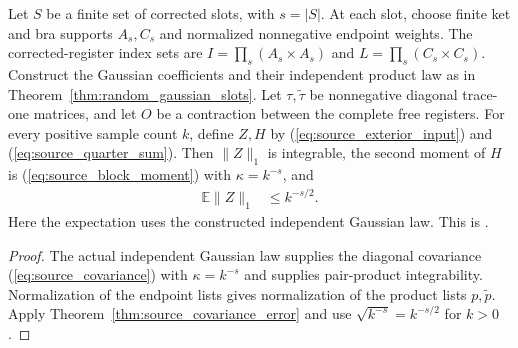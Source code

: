\begin{theorem}
    \label{thm:source_gaussian_error}
    \leanok
    Let $S$ be a finite set of corrected slots, with $s=|S|$. At each slot,
    choose finite ket and bra supports $A_s,C_s$ and normalized nonnegative
    endpoint weights. The corrected-register index sets are
    $I=\prod_s(A_s\times A_s)$ and $L=\prod_s(C_s\times C_s)$.
    Construct the Gaussian coefficients and their independent
    product law as in Theorem~\ref{thm:random_gaussian_slots}.
    Let $\tau,\widetilde\tau$ be nonnegative diagonal trace-one matrices,
    and let $O$ be a contraction between the complete free registers.
    For every positive sample count $k$, define $Z,H$ by
    (\ref{eq:source_exterior_input}) and (\ref{eq:source_quarter_sum}).
    Then $\lVert Z\rVert_1$ is integrable, the second moment of $H$ is
    (\ref{eq:source_block_moment}) with $\kappa=k^{-s}$, and
    \begin{align}
        \mathbb E\lVert Z\rVert_1 & \leq k^{-s/2}.
        \label{eq:source_gaussian_error}
    \end{align}
    Here the expectation uses the constructed independent Gaussian law.
    This is \cite[Equation~(5.18)]{OpenAI2026PolynomialPEPS}.
\end{theorem}

\begin{proof}\leanok
    The actual independent Gaussian law supplies the diagonal covariance
    (\ref{eq:source_covariance}) with $\kappa=k^{-s}$ and supplies pair-product
    integrability. Normalization of the endpoint lists gives normalization
    of the product lists $p,\widetilde p$.
    Apply Theorem~\ref{thm:source_covariance_error} and use
    $\sqrt{k^{-s}}=k^{-s/2}$ for $k>0$.
\end{proof}
